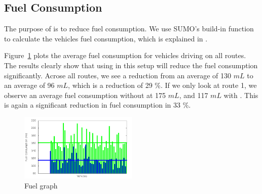 %
%
%
\subsection{Fuel Consumption}
The purpose of \tech is to reduce fuel consumption. 
We use SUMO's build-in function to calculate the vehicles fuel consumption, which is explained in \cite{SUMOFuel}.

Figure~\ref{fig:TestResults:fuelRoute} plots the average fuel consumption for vehicles driving on all routes. 
The results clearly show that using \tech in this setup will reduce the fuel consumption significantly.
Acrose all routes, we see a reduction from an average of 130 $mL$ to an average of 96 $mL$, which is a reduction of 29 \%.
If we only look at route 1, we observe an average fuel consumption without \tech at 175 $mL$, and 117 $mL$ with \tech.
This is again a significant reduction in fuel consumption in 33 \%. %

\begin{figure}[htb]
\includegraphics[width=0.5\textwidth]{images/fuelRoute.png}
\caption{Fuel graph}
\label{fig:TestResults:fuelRoute}
\end{figure}


%
%

